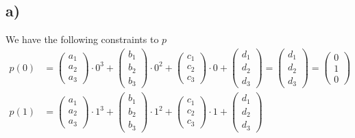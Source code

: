 \documentclass{article}
\begin{document}
    \subsection*{a)}
        We have the following constraints to $p$
        \begin{align}
            p(0) &= \left(\begin{matrix} a_1\\a_2\\a_3 \end{matrix}\right) \cdot 0^3 + \left(\begin{matrix} b_1\\b_2\\b_3 \end{matrix}\right) \cdot 0^2
                + \left(\begin{matrix} c_1\\c_2\\c_3 \end{matrix}\right) \cdot 0 + \left(\begin{matrix} d_1\\d_2\\d_3 \end{matrix}\right)
                = \left(\begin{matrix} d_1\\d_2\\d_3 \end{matrix}\right)
                = \left(\begin{matrix} 0\\1\\0 \end{matrix}\right)\\
            p(1) &= \left(\begin{matrix} a_1\\a_2\\a_3 \end{matrix}\right) \cdot 1^3 + \left(\begin{matrix} b_1\\b_2\\b_3 \end{matrix}\right) \cdot 1^2
                + \left(\begin{matrix} c_1\\c_2\\c_3 \end{matrix}\right) \cdot 1 + \left(\begin{matrix} d_1\\d_2\\d_3 \end{matrix}\right)

\end{align}
\end{document}
